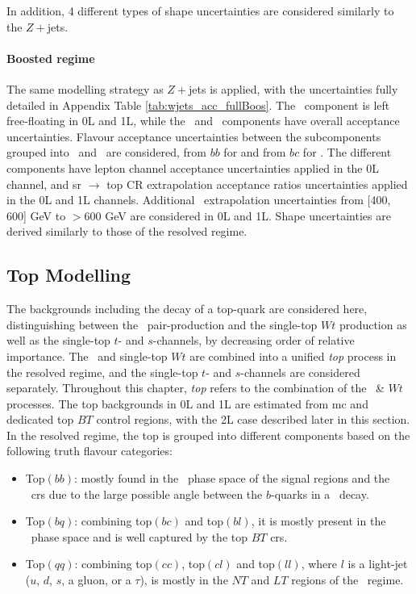 In addition, 4 different types of shape uncertainties are considered similarly to the $Z+$jets.

\paragraph{Boosted regime} The same modelling strategy as $Z+$jets is applied, with the uncertainties fully detailed in Appendix Table \ref{tab:wjets_acc_fullBoos}. The \whf\ component is left free-floating in 0L and 1L, while the \wmf\ and \wlf\ components have overall acceptance uncertainties. Flavour acceptance uncertainties between the subcomponents grouped into \whf\ and  \wmf\ are considered, from $bb$ for \whf and from $bc$ for \wmf. The different components have lepton channel acceptance uncertainties applied in the 0L channel, and \gls{sr} $\rightarrow$ top CR extrapolation acceptance ratios uncertainties applied in the 0L and 1L channels. Additional \ptv\ extrapolation uncertainties from [400, 600] GeV to $> 600$ GeV are considered in 0L and 1L. Shape uncertainties are derived similarly to those of the resolved regime. 

\subsection{Top Modelling}\label{sec-modTop} 
The backgrounds including the decay of a top-quark are considered here, distinguishing between the \ttb\ pair-production and the single-top $Wt$ production as well as the single-top $t$- and $s$-channels, by decreasing order of relative importance. The \ttb\ and single-top $Wt$ are combined into a unified \textit{top} process in the resolved regime, and the single-top $t$- and $s$-channels are considered separately. Throughout this chapter, \textit{top} refers to the combination of the \ttb\ \& $Wt$ processes. The top backgrounds in 0L and 1L are estimated from \gls{mc} and dedicated top $BT$ control regions, with the 2L case described later in this section. In the resolved regime, the top is grouped into different components based on the following truth flavour categories:
\begin{itemize}
    \item Top$(bb)$: mostly found in the \vhb\ phase space of the signal regions and the \highdr\ \glspl{cr} due to the large possible angle between the $b$-quarks in a \ttb\ decay. 
    \item Top$(bq)$: combining top$(bc)$ and top$(bl)$, it is mostly present in the \vhc\ phase space and is well captured by the top $BT$ \glspl{cr}.
    \item Top$(qq)$: combining top$(cc)$, top$(cl)$ and top$(ll)$, where $l$ is a light-jet ($u$, $d$, $s$, a gluon, or a $\tau$), is mostly in the $NT$ and $LT$ regions of the \vhc\ regime. 
\end{itemize}

